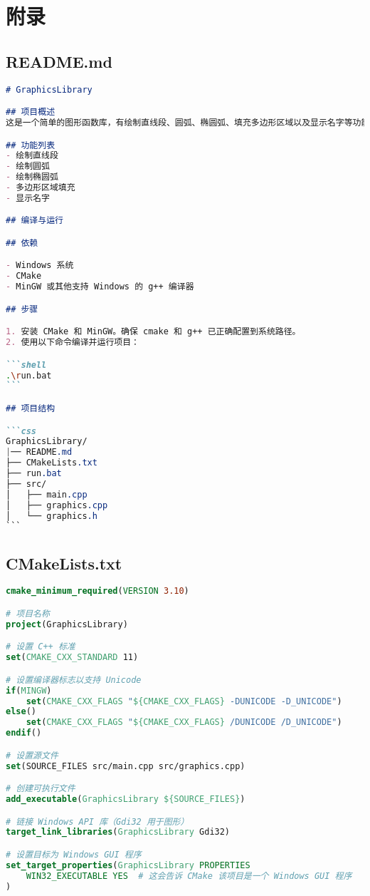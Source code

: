 \documentclass[11pt,a4paper]{article}
\begin{document}
\appendix
\section{附录}

\subsection{README.md}
\begin{lstlisting}[language=Markdown]
# GraphicsLibrary

## 项目概述
这是一个简单的图形函数库，有绘制直线段、圆弧、椭圆弧、填充多边形区域以及显示名字等功能。该项目采用 C++ 编写，并使用 CMake 构建工具。

## 功能列表
- 绘制直线段
- 绘制圆弧
- 绘制椭圆弧
- 多边形区域填充
- 显示名字

## 编译与运行

## 依赖

- Windows 系统
- CMake
- MinGW 或其他支持 Windows 的 g++ 编译器

## 步骤

1. 安装 CMake 和 MinGW。确保 cmake 和 g++ 已正确配置到系统路径。
2. 使用以下命令编译并运行项目：

```shell
.\run.bat
```

## 项目结构

```css
GraphicsLibrary/
|── README.md
├── CMakeLists.txt
├── run.bat
├── src/
│   ├── main.cpp
│   ├── graphics.cpp
│   └── graphics.h
```

\end{lstlisting}

\subsection{CMakeLists.txt}
\begin{lstlisting}[language=CMake]
cmake_minimum_required(VERSION 3.10)

# 项目名称
project(GraphicsLibrary)

# 设置 C++ 标准
set(CMAKE_CXX_STANDARD 11)

# 设置编译器标志以支持 Unicode
if(MINGW)
    set(CMAKE_CXX_FLAGS "${CMAKE_CXX_FLAGS} -DUNICODE -D_UNICODE")
else()
    set(CMAKE_CXX_FLAGS "${CMAKE_CXX_FLAGS} /DUNICODE /D_UNICODE")
endif()

# 设置源文件
set(SOURCE_FILES src/main.cpp src/graphics.cpp)

# 创建可执行文件
add_executable(GraphicsLibrary ${SOURCE_FILES})

# 链接 Windows API 库（Gdi32 用于图形）
target_link_libraries(GraphicsLibrary Gdi32)

# 设置目标为 Windows GUI 程序
set_target_properties(GraphicsLibrary PROPERTIES
    WIN32_EXECUTABLE YES  # 这会告诉 CMake 该项目是一个 Windows GUI 程序
)

\end{lstlisting}
\end{document}
